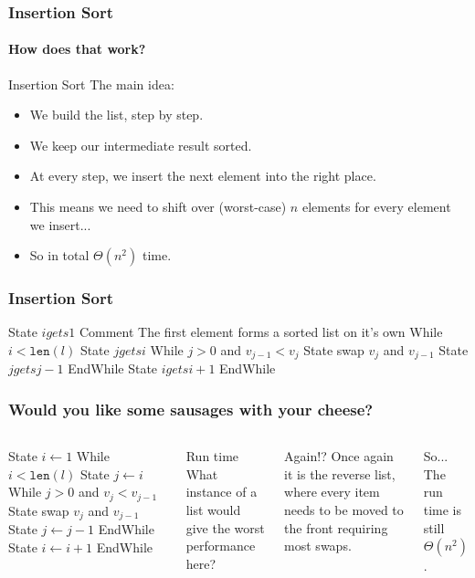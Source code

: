 \begin{frame}
	\frametitle{Insertion Sort}
	\framesubtitle{How does that work?}
		\begin{block}{Insertion Sort}
			The main idea:
			\begin{itemize}
				\item We build the list, step by step.
					\pause
				\item We keep our intermediate result sorted.
					\pause
				\item At every step, we insert the next element into the right place.
					\pause
				\item This means we need to shift over (worst-case) $n$ elements for every element we insert...
					\pause
				\item So in total $\Theta(n^2)$ time.
			\end{itemize}
		\end{block}
\end{frame}

\begin{frame}
	\frametitle{Insertion Sort}
	\begin{block}
		State $i gets 1$ Comment {The first element forms a sorted list on it's own}
		\pause
		While $i < \texttt{len}(l)$
		State $j gets i$
		\pause
		While $j > 0$ and $v_{j-1} < v_{j}$ 
			State swap $v_j$ and $v_{j-1}$	
			State $j gets j -1$
		EndWhile
		\pause
		State $i gets i+1$
		EndWhile
	\end{block}
	\pause
	\begin{center}
	
	\end{center}
\end{frame}

\begin{frame}
	\frametitle{Would you like some sausages with your cheese?}
	\begin{columns}
		\column{0.455\textwidth}
		\begin{block}
			State $i \gets 1$ 
			While $i < \texttt{len}(l)$
			State $j \gets i$
			While $j > 0$ and $v_j < v_{j-1}$
			State swap $v_j$ and $v_{j-1}$	
			State $j \gets j -1$
			EndWhile
			State $i \gets i+1$
			EndWhile
		\end{block}
		\column{0.455\textwidth}
		\begin{block}{Run time}
			What instance of a list would give the worst performance here?	
		\end{block}
		\pause
		\begin{block}{Again!?}
			Once again it is the reverse list, where every item needs to be moved to the front requiring most swaps.
		\end{block}
		\pause
			\begin{block}{So...}
				The run time is still $\Theta(n^2)$.
			\end{block}	
	\end{columns}

	
\end{frame}

